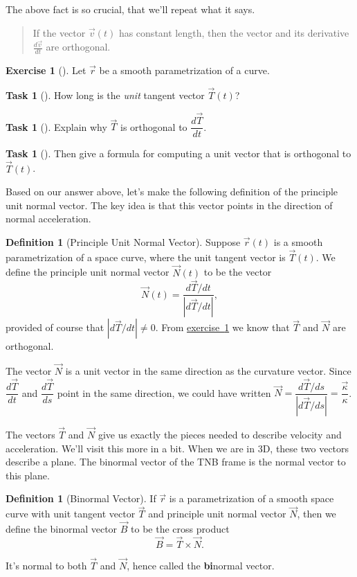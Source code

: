 \documentclass[10pt,]{book}
\newcommand{\terminology}[1]{\textbf{#1}}
\theoremstyle{plain}
\theoremstyle{definition}
\newtheorem{definition}[theorem]{Definition}
\theoremstyle{definition}
\theoremstyle{definition}
\theoremstyle{definition}
\newtheorem{exploration}[project]{Exercise}
\newtheorem{task}[project]{Task}
\theoremstyle{definition}
\numberwithin{equation}{section}
\newcommand{\ds}{\displaystyle}
\begin{document}
The above fact is so crucial, that we'll repeat what it says.%
\begin{quote}\hypertarget{blockquote-4}{}
If the vector \(\vec v(t)\) has constant length, then the vector and its derivative \(\frac{d\vec v}{dt}\) are orthogonal.\end{quote}
\begin{exploration}[]\label{T_and_N_are_orthogonal}
Let \(\vec r\) be a smooth parametrization of a curve.%
\begin{task}[]\label{task-435}
How long is the \emph{unit} tangent vector \(\vec T(t)\)?%
\end{task}
\begin{task}[]\label{task-436}
Explain why \(\vec T\) is orthogonal to \(\dfrac{d\vec T}{dt}\).%
\end{task}
\begin{task}[]\label{task-437}
Then give a formula for computing a unit vector that is orthogonal to \(\vec T(t)\).%
\end{task}
\end{exploration}
Based on our answer above, let's make the following definition of the principle unit normal vector. The key idea is that this vector points in the direction of normal acceleration.%
\begin{definition}[{Principle Unit Normal Vector}]\label{definition-28}
Suppose \(\vec r(t)\) is a smooth parametrization of a space curve, where the unit tangent vector is \(\vec T(t)\). We define the principle unit normal vector \(\vec N(t)\) to be the vector%
\begin{equation*}
\vec N(t) = \ds\frac{d\vec T/dt}{|d\vec T/dt|},
\end{equation*}
provided of course that \(|d\vec T/dt|\neq 0\). From \hyperref[T_and_N_are_orthogonal]{exercise~\ref{T_and_N_are_orthogonal}} we know that \(\vec T\) and \(\vec N\) are orthogonal.%
\end{definition}
The vector \(\vec N\) is a unit vector in the same direction as the curvature vector. Since \(\dfrac{d\vec T}{dt}\) and \(\dfrac{d\vec T}{ds}\) point in the same direction, we could have written \(\vec N = \dfrac{d\vec T/ds}{|d\vec T/ds|} = \dfrac{\vec \kappa}{\kappa}\).%
\par
The vectors \(\vec T\) and \(\vec N\) give us exactly the pieces needed to describe velocity and acceleration. We'll visit this more in a bit. When we are in 3D, these two vectors describe a plane. The binormal vector of the TNB frame is the normal vector to this plane.%
\begin{definition}[{Binormal Vector}]\label{definition-29}
If \(\vec r\) is a parametrization of a smooth space curve with unit tangent vector \(\vec T\) and principle unit normal vector \(\vec N\), then we define the binormal vector \(\vec B\) to be the cross product%
\begin{equation*}
\vec B = \vec T\times \vec N.
\end{equation*}
%
\par
It's normal to both \(\vec T\) and \(\vec N\), hence called the \terminology{bi}normal vector.%
\end{definition}
\end{document}

